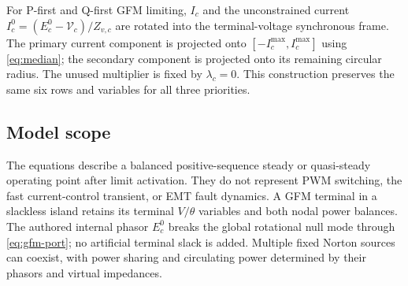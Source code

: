 For P-first and Q-first GFM limiting, $I_c$ and the unconstrained current
$I_c^0=(E_c^0-\mathcal V_c)/Z_{v,c}$ are rotated into the terminal-voltage synchronous
frame. The primary current component is projected onto
$[-I_c^{\max},I_c^{\max}]$ using \eqref{eq:median}; the secondary component is
projected onto its remaining circular radius. The unused multiplier is fixed
by $\lambda_c=0$. This construction preserves the same six rows and variables
for all three priorities.

\subsection{Model scope}

The equations describe a balanced positive-sequence steady or quasi-steady
operating point after limit activation. They do not represent PWM switching,
the fast current-control transient, or EMT fault dynamics. A GFM terminal in a
slackless island retains its terminal $V/\theta$ variables and both nodal power
balances. The authored internal phasor $E_c^0$ breaks the global rotational
null mode through \eqref{eq:gfm-port}; no artificial terminal slack is added.
Multiple fixed Norton sources can coexist, with power sharing and circulating
power determined by their phasors and virtual impedances.
